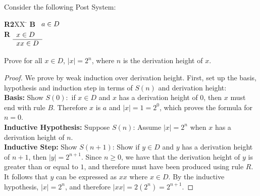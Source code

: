 \documentclass[]{exam}
\begin{document}
\begin{questions}
\begin{enumerate}[label=\alph*)]
\begin{solution}
\end{solution}
\end{enumerate}

\question Consider the following Post System:
\begin{tabbing}
{\bf R2}XX \=  \kill
{\bf B} \>
        \(\begin{array}[t]{l}
        a \in D
        \end{array}\) \\[2ex]
{\bf R} \>
        \(\begin{array}[t]{l}
        x \in D \\
        \hline
        xx \in D
        \end{array}\) 
\end{tabbing}

Prove for all $x \in D$, $|x| = 2^n$, where $n$ is the derivation height
of $x$. 
\begin{solution}
\begin{proof}
We prove by weak induction over derivation height. 
First, set up the basis, hypothesis and induction step in terms of $S(n)$ and
derivation height:
~\\
\textbf{Basis:} Show $S(0):$ if $x \in D$ and $x$ has a derivation height of
$0$, then $x$ must end with rule $B$. Therefore $x$ is $a$ and $|x| = 1 = 2^0$,
which proves the formula for $n = 0$.
~\\
\textbf{Inductive Hypothesis:} Suppose $S(n)$: Assume $|x| = 2^n$ when $x$ has 
a derivation height of $n$.
~\\
\textbf{Inductive Step:} Show $S(n+1)$: Show if $y \in D$ and $y$ has a
derivation height of $n + 1$, then $|y| = 2^{n + 1}$. Since $n \geq 0$,
we have that the derivation height of $y$ is greater than or equal to
$1$, and therefore must have been produced using rule $R$. It follows
that $y$ can be expressed as $xx$ where $x \in D$. By the inductive hypothesis,
$|x| = 2^n$, and therefore $|xx| = 2(2^n) = 2^{n+1}$.
\end{proof}

\end{solution}


\end{questions}
\end{document}

